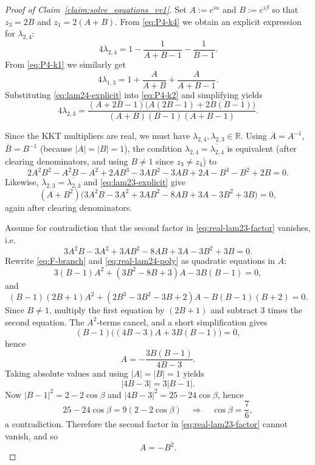 \documentclass{article}
\theoremstyle{definition}
\newcounter{row}
\begin{document}
\begin{proof}[Proof of Claim~\ref{claim:solve_equations_vv1}]
Set $A:=e^{i\alpha}$ and $B:=e^{i\beta}$ so that $z_3=2B$ and $z_1=2(A+B)$. From \eqref{eq:P4-k4} we obtain an explicit expression for \(\lambda_{2,4}\):
\begin{equation}\label{eq:lam24-explicit}
4\lambda_{2,4}
=1-\frac{1}{A+B-1}-\frac{1}{B-1}.
\end{equation}
From \eqref{eq:P4-k1} we similarly get
\begin{equation}\label{eq:lam13-explicit}
4\lambda_{1,3}
=1+\frac{A}{A+B}+\frac{A}{A+B-1}.
\end{equation}
Substituting \eqref{eq:lam24-explicit} into \eqref{eq:P4-k2} and simplifying yields
\begin{equation}\label{eq:lam23-explicit}
4\lambda_{2,3}
=\frac{(A+2B-1)\bigl(A(2B-1)+2B(B-1)\bigr)}{(A+B)(B-1)(A+B-1)}.
\end{equation}


Since the KKT multipliers are real, we must have
\(\lambda_{2,4},\lambda_{2,3}\in\mathbb R\).
Using \(\overline A=A^{-1}\), \(\overline B=B^{-1}\) (because \(|A|=|B|=1\)),
the condition \(\lambda_{2,4}=\overline{\lambda_{2,4}}\) is equivalent (after clearing denominators,
and using \(B\neq 1\) since \(z_3\neq z_4\)) to
\begin{equation}\label{eq:real-lam24-poly}
2A^2B^2 - A^2B - A^2 + 2AB^3 -3AB^2 -3AB +2A -B^3 -B^2 +2B=0.
\end{equation}
Likewise, \(\lambda_{2,3}=\overline{\lambda_{2,3}}\) and \eqref{eq:lam23-explicit} give
\begin{equation}\label{eq:real-lam23-factor}
(A+B^2)\bigl(3A^2B-3A^2+3AB^2-8AB+3A-3B^2+3B\bigr)=0,
\end{equation}
again after clearing denominators.


Assume for contradiction that the second factor in \eqref{eq:real-lam23-factor} vanishes, i.e.
\begin{equation}\label{eq:F-branch}
3A^2B-3A^2+3AB^2-8AB+3A-3B^2+3B=0.
\end{equation}
Rewrite \eqref{eq:F-branch} and \eqref{eq:real-lam24-poly} as quadratic equations in $A$:
\[
3(B-1)A^2+(3B^2-8B+3)A-3B(B-1)=0,
\]
and
\[
(B-1)(2B+1)A^2+(2B^3-3B^2-3B+2)A-B(B-1)(B+2)=0.
\]
Since $B\neq 1$, multiply the first equation by $(2B+1)$ and subtract $3$ times the second equation.
The $A^2$-terms cancel, and a short simplification gives
\[
(B-1)\bigl((4B-3)A+3B(B-1)\bigr)=0,
\]
hence
\begin{equation}\label{eq:A-rational}
A=-\frac{3B(B-1)}{4B-3}.
\end{equation}
Taking absolute values and using $|A|=|B|=1$ yields
\[
|4B-3|=3|B-1|.
\]
Now $|B-1|^2=2-2\cos\beta$ and $|4B-3|^2=25-24\cos\beta$, hence
\[
25-24\cos\beta=9(2-2\cos\beta)\quad\Rightarrow\quad \cos\beta=\frac{7}{6},
\]
a contradiction. Therefore the second factor in \eqref{eq:real-lam23-factor} cannot vanish, and so
\begin{equation}\label{eq:A=-B2}
A=-B^2.
\end{equation}




\end{proof}
\end{document}
